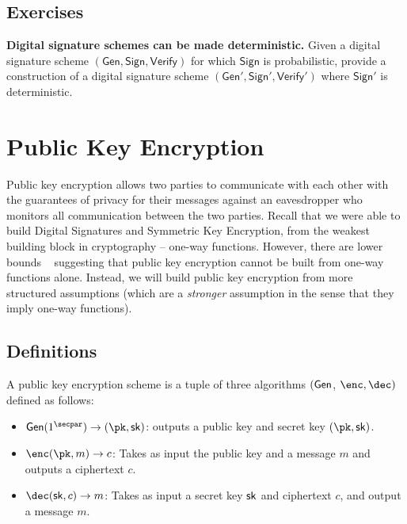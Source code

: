 \section*{Exercises}
\begin{exercise}
\textbf{Digital signature schemes can be made deterministic.} Given a digital signature scheme $(\mathsf{Gen}, \mathsf{Sign}, \mathsf{Verify})$ for which $\mathsf{Sign}$ is probabilistic, provide a construction of a digital signature scheme $(\mathsf{Gen}', \mathsf{Sign}', \mathsf{Verify}')$ where $\mathsf{Sign}'$ is deterministic.
\end{exercise}

\chapter{Public Key Encryption}
Public key encryption allows two parties
to communicate with each other with the guarantees of privacy for their messages against an eavesdropper who monitors all communication between the two parties. Recall that we were able to build Digital Signatures and Symmetric Key Encryption, from the weakest building block in cryptography -- one-way functions. However, there are lower bounds
~\cite{STOC:ImpRud89} 
suggesting that public key encryption cannot be built from one-way functions alone. Instead, we will build public key encryption from more structured assumptions (which are a \emph{stronger} assumption in the sense that they imply one-way functions).

\section{Definitions}
\begin{definition}
    A public key encryption scheme is a tuple of three algorithms $(\mathsf{Gen}$, $\enc, \dec)$ defined as follows:
    \begin{itemize}
        \item $\gen(1^\secpar) \to (\pk, \sk)$: outputs a public key and secret key $(\pk, \sk)$.

        \item $\enc(\pk, m) \to c$: Takes as input the public key and a message $m$ and outputs a ciphertext $c$.

        \item $\dec(\sk, c) \to m$: Takes as input a secret key $\mathsf{sk}$ and ciphertext $c$, and output a message $m$.
    \end{itemize}
\end{definition}

